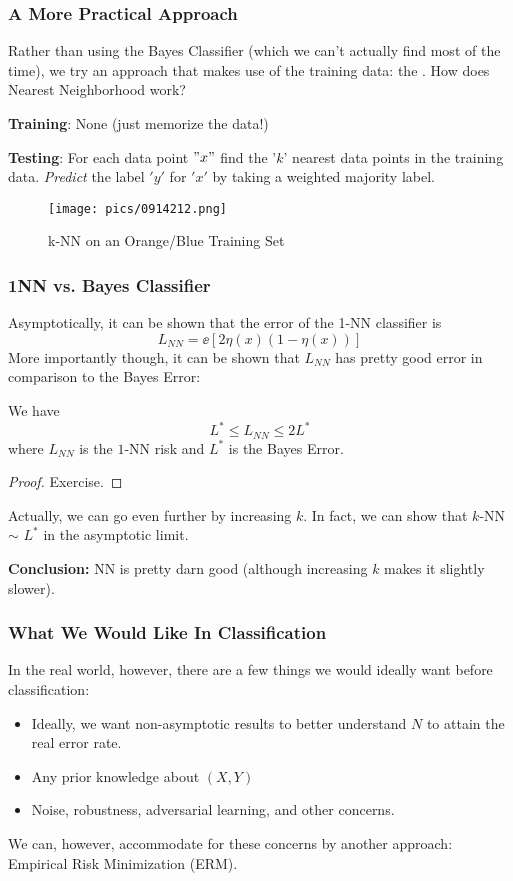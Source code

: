 \documentclass[11pt]{scrartcl}
\begin{document}
\subsubsection{A More Practical Approach}
Rather than using the Bayes Classifier (which we can't actually find most of the time), we try an approach that makes use of the training data: the . How does Nearest Neighborhood work? 

\textbf{Training}: None (just memorize the data!)

\textbf{Testing}: For each data point $"x"$ find the '$k$' nearest data points in the training data. \textit{Predict} the label $'y'$ for $'x'$ by taking a weighted majority label.

\begin{figure}[h]
    \centering
    \texttt{[image: pics/0914212.png]}
    \caption{k-NN on an Orange/Blue Training Set}
\end{figure}

\subsubsection{1NN vs. Bayes Classifier}
Asymptotically, it can be shown that the error of the 1-NN classifier is $$L_{NN}=\ee[2\eta(x)(1-\eta(x))]$$
More importantly though, it can be shown that $L_{NN}$ has pretty good error in comparison to the Bayes Error:
\begin{thm}
We have $$L^{*} \le L_{NN} \le 2L^*$$ where $L_{NN}$ is the $1$-NN risk and $L^*$ is the Bayes Error.
\end{thm}
\begin{proof}
Exercise.
\end{proof}
Actually, we can go even further by increasing $k$. In fact, we can show that $k$-NN $\sim$ $L^*$ in the asymptotic limit. 

\textbf{Conclusion:} NN is pretty darn good (although increasing $k$ makes it slightly slower).

\subsubsection{What We Would Like In Classification}
In the real world, however, there are a few things we would ideally want before classification:
\begin{itemize}
\item Ideally, we want non-asymptotic results to better understand $N$ to attain the real error rate. 
\item Any prior knowledge about $(X,Y)$
\item Noise, robustness, adversarial learning, and other concerns. 
\end{itemize}
We can, however, accommodate for these concerns by another approach: Empirical Risk Minimization (ERM). 
\end{document}
